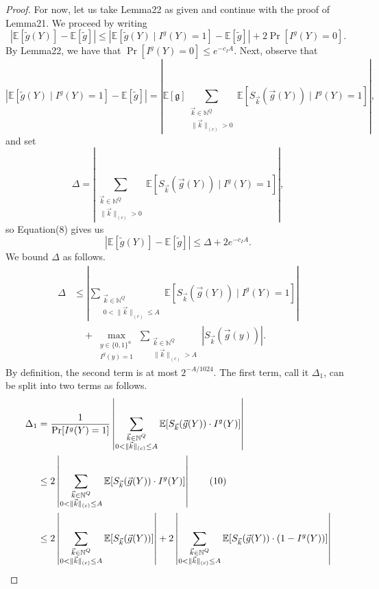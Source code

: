 \begin{proof}
For now, let us take Lemma22 as given and continue with the proof of Lemma21. We proceed by writing
\begin{equation}
|\mathbb E[\widetilde g(Y)]-\mathbb E[\widetilde g]|
\le|\mathbb E[\widetilde g(Y)\mid I^g(Y)=1]-\mathbb E[\widetilde g]|
+2\Pr[I^g(Y)=0].\tag{8}
\end{equation}
By Lemma22, we have that $\Pr[I^g(Y)=0]\le e^{-c_IA}$. Next, observe that
\[
|\mathbb E[\widetilde g(Y)\mid I^g(Y)=1]-\mathbb E[\widetilde g]|
=\left|\mathbb E[\mathfrak g]\sum_{\substack{\vec k\in\mathbb N^Q\\\|\vec k\|_{(c)}>0}}
\mathbb E[S_{\vec k}(\vec g(Y))\mid I^g(Y)=1]\right|,
\]
and set
\[
\Delta=\left|\sum_{\substack{\vec k\in\mathbb N^Q\\\|\vec k\|_{(c)}>0}}
\mathbb E[S_{\vec k}(\vec g(Y))\mid I^g(Y)=1]\right|,
\]
so Equation(8) gives us
\begin{equation}
|\mathbb E[\widetilde g(Y)]-\mathbb E[\widetilde g]|\le\Delta+2e^{-c_IA}.\tag{9}
\end{equation}
We bound $\Delta$ as follows.
\begin{align*}
\Delta&\le\left|\sum_{\substack{\vec k\in\mathbb N^Q\\0<\|\vec k\|_{(c)}\le A}}
\mathbb E[S_{\vec k}(\vec g(Y))\mid I^g(Y)=1]\right|\\
&\quad+\max_{\substack{y\in\{0,1\}^n\\I^g(y)=1}}
\sum_{\substack{\vec k\in\mathbb N^Q\\\|\vec k\|_{(c)}>A}}|S_{\vec k}(\vec g(y))|.
\end{align*}
By definition, the second term is at most $2^{-A/1024}$. The first term, call it $\Delta_1$, can be split into two terms as follows.
\begin{align}
\Delta_1
&=\frac1{\Pr[I^g(Y)=1]}\left|\sum_{\substack{\vec k\in\mathbb N^Q\\0<\|\vec k\|_{(c)}\le A}}\mathbb E[S_{\vec k}(\vec g(Y))\cdot I^g(Y)]\right|\notag\\
&\le2\left|\sum_{\substack{\vec k\in\mathbb N^Q\\0<\|\vec k\|_{(c)}\le A}}\mathbb E[S_{\vec k}(\vec g(Y))\cdot I^g(Y)]\right|\tag{10}\\
&\le2\left|\sum_{\substack{\vec k\in\mathbb N^Q\\0<\|\vec k\|_{(c)}\le A}}\mathbb E[S_{\vec k}(\vec g(Y))]\right|
+2\left|\sum_{\substack{\vec k\in\mathbb N^Q\\0<\|\vec k\|_{(c)}\le A}}\mathbb E[S_{\vec k}(\vec g(Y))\cdot(1-I^g(Y))]\right|\notag\\

\end{align}
\end{proof}
